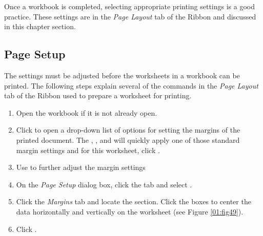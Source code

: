 Once a workbook is completed, selecting appropriate printing settings is a good practice. These settings are in the \textit{Page Layout} tab of the Ribbon and discussed in this chapter section.

\subsection{Page Setup}

The settings must be adjusted before the worksheets in a workbook can be printed. The following steps explain several of the commands in the \textit{Page Layout} tab of the Ribbon used to prepare a worksheet for printing.

\begin{enumbox}
	\begin{enumerate}
		\item Open the  workbook if it is not already open.
		\item Click  to open a drop-down list of options for setting the margins of the printed document. The , , and  will quickly apply one of those standard margin settings and for this worksheet, click .
		\item Use  to further adjust the margin settings
		\item On the \textit{Page Setup} dialog box, click the  tab and select .
		\item Click the \textit{Margins} tab and locate the  section. Click the boxes to center the data horizontally and vertically on the worksheet (see Figure \ref{01:fig49}).
		\item Click .
	\end{enumerate}
\end{enumbox}

